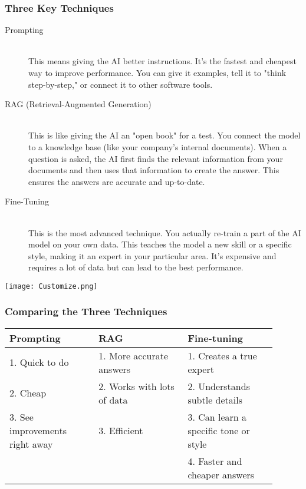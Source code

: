 \subsubsection{Three Key Techniques}

\begin{description}
    \item[Prompting] \hfill \\
    This means giving the AI better instructions. It's the fastest and cheapest way to improve performance. You can give it examples, tell it to "think step-by-step," or connect it to other software tools.
    \item[RAG (Retrieval-Augmented Generation)] \hfill \\
    This is like giving the AI an "open book" for a test. You connect the model to a knowledge base (like your company's internal documents). When a question is asked, the AI first finds the relevant information from your documents and then uses that information to create the answer. This ensures the answers are accurate and up-to-date.
    \item[Fine-Tuning] \hfill \\
    This is the most advanced technique. You actually re-train a part of the AI model on your own data. This teaches the model a new skill or a specific style, making it an expert in your particular area. It's expensive and requires a lot of data but can lead to the best performance.
\end{description}
\begin{center}
\texttt{[image: Customize.png]}
\end{center}
\newpage
\subsubsection{Comparing the Three Techniques}

\begin{tcolorbox}[title=Pros: The Good Stuff, boxrule=1pt, sharp corners]
\begin{tabular}{p{0.3\linewidth} | p{0.3\linewidth} | p{0.3\linewidth}}
    \textbf{Prompting} & \textbf{RAG} & \textbf{Fine-tuning} \\
    \hline
    1. Quick to do & 1. More accurate answers & 1. Creates a true expert \\
    2. Cheap & 2. Works with lots of data & 2. Understands subtle details \\
    3. See improvements right away & 3. Efficient & 3. Can learn a specific tone or style \\
     &  & 4. Faster and cheaper answers \\
\end{tabular}
\end{tcolorbox}

